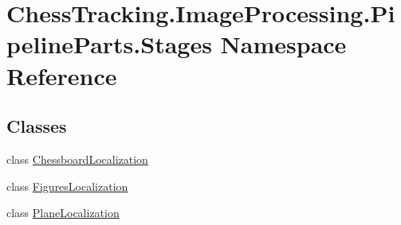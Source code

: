 \hypertarget{namespace_chess_tracking_1_1_image_processing_1_1_pipeline_parts_1_1_stages}{}\section{Chess\+Tracking.\+Image\+Processing.\+Pipeline\+Parts.\+Stages Namespace Reference}
\label{namespace_chess_tracking_1_1_image_processing_1_1_pipeline_parts_1_1_stages}
\subsection*{Classes}
\begin{DoxyCompactItemize}
\item 
class \mbox{\hyperlink{class_chess_tracking_1_1_image_processing_1_1_pipeline_parts_1_1_stages_1_1_chessboard_localization}{Chessboard\+Localization}}
\item 
class \mbox{\hyperlink{class_chess_tracking_1_1_image_processing_1_1_pipeline_parts_1_1_stages_1_1_figures_localization}{Figures\+Localization}}
\item 
class \mbox{\hyperlink{class_chess_tracking_1_1_image_processing_1_1_pipeline_parts_1_1_stages_1_1_plane_localization}{Plane\+Localization}}
\end{DoxyCompactItemize}
